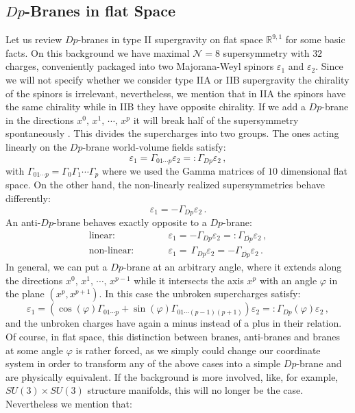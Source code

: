 \documentclass[12pt]{report}
\newcommand{\be}{\begin{equation}}
\newcommand{\ee}{\end{equation}}
\begin{document}
\subsection{$Dp$-Branes in flat Space}
\label{sec:flatspacebranes}
Let us review $Dp$-branes in type II supergravity on flat space $\mathbb{R}^{9,1}$ \cite{Polchinski:1998rr,Cederwall:1996pv,Aganagic:1996pe,Cederwall:1996ri,Bergshoeff:1996tu,Aganagic:1996nn} for some basic facts. On this background we have maximal $\mathcal{N}=8$ supersymmetry with $32$ charges, conveniently packaged into two Majorana-Weyl spinors $\varepsilon_1$ and $\varepsilon_2$. Since we will not specify whether we consider type IIA or IIB supergravity the chirality of the spinors is irrelevant, nevertheless, we mention that in IIA the spinors have the same chirality while in IIB they have opposite chirality. If we add a $Dp$-brane in the directions $x^0,\,x^1,\,\cdots,\,x^p$ it will break half of the supersymmetry spontaneously \cite{Polchinski:1998rr}. This divides the supercharges into two groups. The ones acting linearly on the $Dp$-brane world-volume fields satisfy:
\be 
\varepsilon_1 = \Gamma_{01\cdots p} \varepsilon_2 =: \Gamma_{Dp}\varepsilon_2\,,
\ee
with $\Gamma_{01\cdots p} = \Gamma_0 \Gamma_1 \cdots \Gamma_p$ where we used the Gamma matrices of $10$ dimensional flat space. On the other hand, the non-linearly realized supersymmetries behave differently:
\be 
\varepsilon_1 = -\Gamma_{Dp}\varepsilon_2\,.
\ee
An anti-$Dp$-brane behaves exactly opposite to a $Dp$-brane:
\be
\begin{matrix}
\text{linear:} & \qquad &\varepsilon_1 = - \Gamma_{Dp} \varepsilon_2 =: \Gamma_{\overline{Dp}} \varepsilon_2\,,\\
\text{non-linear:} & &\varepsilon_1 = \, \Gamma_{Dp} \varepsilon_2 = -\Gamma_{\overline{Dp}} \varepsilon_2\,.
\end{matrix}
\ee
In general, we can put a $Dp$-brane at an arbitrary angle, where it extends along the directions $x^0,\,x^1,\,\cdots ,\, x^{p-1}$ while it intersects the axis $x^p$ with an angle $\varphi$ in the plane $(x^p,x^{p+1})$. In this case the unbroken supercharges satisfy:
\be 
\varepsilon_1 = \left(\cos (\varphi) \Gamma_{01\cdots p} + \sin (\varphi) \Gamma_{01\cdots(p-1)(p+1)} \right)\varepsilon_2 =: \Gamma_{Dp}(\varphi) \varepsilon_2\,,
\ee
and the unbroken charges have again a minus instead of a plus in their relation. Of course, in flat space, this distinction between branes, anti-branes and branes at some angle $\varphi$ is rather forced, as we simply could change our coordinate system in order to transform any of the above cases into a simple $Dp$-brane and are physically equivalent. If the background is more involved, like, for example,  $SU(3)\times SU(3)$ structure manifolds, this will no longer be the case. Nevertheless we mention that:
\end{document}
